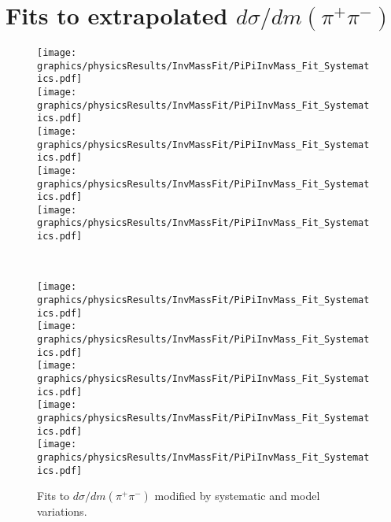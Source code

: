 
\chapter{Fits to extrapolated $d\sigma/dm(\pi^{+}\pi^{-})$}\label{appendix:invMassSystFits}

\begin{figure}[hb]
\caption{Fits to $d\sigma/dm(\pi^{+}\pi^{-})$ modified by systematic and model variations.}\label{fig:invMassSystFits}
\centering
\parbox{0.495\textwidth}{
  \centering
  \texttt{[image: graphics/physicsResults/InvMassFit/PiPiInvMass\_Fit\_Systematics.pdf]}\\
  \texttt{[image: graphics/physicsResults/InvMassFit/PiPiInvMass\_Fit\_Systematics.pdf]}\\
  \texttt{[image: graphics/physicsResults/InvMassFit/PiPiInvMass\_Fit\_Systematics.pdf]}\\
  \texttt{[image: graphics/physicsResults/InvMassFit/PiPiInvMass\_Fit\_Systematics.pdf]}\\
  \texttt{[image: graphics/physicsResults/InvMassFit/PiPiInvMass\_Fit\_Systematics.pdf]}
}~
\parbox{0.495\textwidth}{
  \centering
  \texttt{[image: graphics/physicsResults/InvMassFit/PiPiInvMass\_Fit\_Systematics.pdf]}\\
  \texttt{[image: graphics/physicsResults/InvMassFit/PiPiInvMass\_Fit\_Systematics.pdf]}\\
  \texttt{[image: graphics/physicsResults/InvMassFit/PiPiInvMass\_Fit\_Systematics.pdf]}\\
  \texttt{[image: graphics/physicsResults/InvMassFit/PiPiInvMass\_Fit\_Systematics.pdf]}\\
  \texttt{[image: graphics/physicsResults/InvMassFit/PiPiInvMass\_Fit\_Systematics.pdf]}
}%
\end{figure}%
